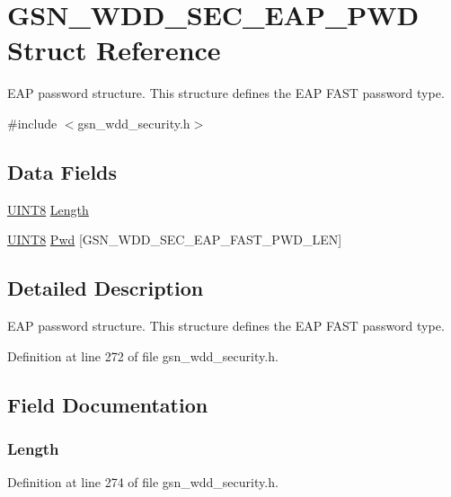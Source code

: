 \hypertarget{a00289}{
\section{GSN\_\-WDD\_\-SEC\_\-EAP\_\-PWD Struct Reference}
\label{a00289}
}


EAP password structure. This structure defines the EAP FAST password type.  




{\ttfamily \#include $<$gsn\_\-wdd\_\-security.h$>$}

\subsection*{Data Fields}
\begin{DoxyCompactItemize}
\item 
\hyperlink{a00660_gab27e9918b538ce9d8ca692479b375b6a}{UINT8} \hyperlink{a00289_a92c9c711d62ad0b99ad1f6c2a94f7bc2}{Length}
\item 
\hyperlink{a00660_gab27e9918b538ce9d8ca692479b375b6a}{UINT8} \hyperlink{a00289_a40435d219dbf1d83e3f9cf72b264df06}{Pwd} \mbox{[}GSN\_\-WDD\_\-SEC\_\-EAP\_\-FAST\_\-PWD\_\-LEN\mbox{]}
\end{DoxyCompactItemize}


\subsection{Detailed Description}
EAP password structure. This structure defines the EAP FAST password type. 

Definition at line 272 of file gsn\_\-wdd\_\-security.h.



\subsection{Field Documentation}
\hypertarget{a00289_a92c9c711d62ad0b99ad1f6c2a94f7bc2}{
\subsubsection[{Length}]{ {\bf Length}}}
\label{a00289_a92c9c711d62ad0b99ad1f6c2a94f7bc2}


Definition at line 274 of file gsn\_\-wdd\_\-security.h.

